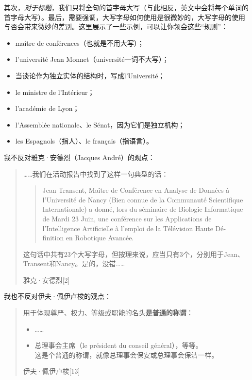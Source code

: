 其次，\emph{对于标题}，我们只将全句的首字母大写（与此相反，英文中会将每个单词的首字母大写）。最后，需要强调，大写字母如何使用是很微妙的，大写字母的使用与否会带来微妙的差别。这里展示了一些示例，可以让你领会这些“规则”：

\begin{itemize}
    \item maître de conférences（也就是不用大写）；
    \item l’université Jean Monnet（université一词不大写）；
    \item 当谈论作为独立实体的结构时，写成l’Université；
    \item le ministre de l’Intérieur；
    \item l’académie de Lyon；
    \item l’Assemblée nationale、le Sénat，因为它们是独立机构；
    \item les Espagnols（指人）、le français（指语言）。
\end{itemize}

我不反对雅克·安德烈（Jacques André）的观点：

\begin{quote}
    ……我们在活动报告中找到了这样一句典型的话：
    
    \begin{quote}
        Jean Transent, Maître de Conférence en Analyse de Données à l’Université de Nancy (Bien connue de la Communauté Scientifique Internationale) a donné, lors du séminaire de Biologie Informatique de Mardi 23 Juin, une conférence sur les Applications de l’Intelligence Artificielle à l’emploi de la Télévision Haute Dé- finition en Robotique Avancée.
    \end{quote}

    这句话中共有23个大写字母，但按理来说，应当只有3个，分别用于Jean、Transent和Nancy。是的，没错……
    
    \hfill 雅克·安德烈[2]
\end{quote}

我也不反对伊夫·佩伊卢梭的观点：

\begin{quote}
    用于体现尊严、权力、等级或职能的名头\textbf{是普通的称谓}：
    \begin{itemize}
        \item ……
        \item 总理事会主席（le président du conseil général），等等。\\\textsf{这是个普通的称谓，就像总理事会保安或总理事会保洁一样。}
    \end{itemize}

    \hfill 伊夫·佩伊卢梭[13]
\end{quote}

